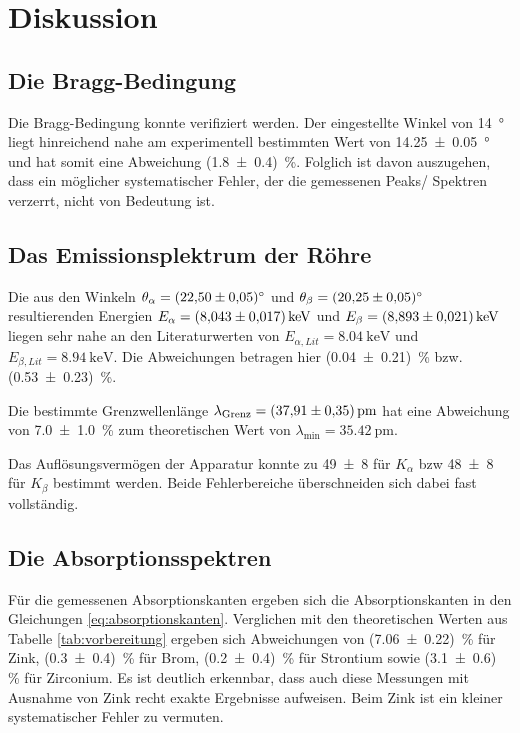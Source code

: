 \section{Diskussion}

\subsection{Die Bragg-Bedingung}
Die Bragg-Bedingung konnte verifiziert werden.
Der eingestellte Winkel von \qty[]{14}{\degree} liegt hinreichend nahe am experimentell bestimmten Wert von \qty{14.25+-0.05}{\degree}
und hat somit eine Abweichung (\num[]{1.8 +- 0.4}) \,\%.
Folglich ist davon auszugehen, dass ein möglicher systematischer Fehler, der die gemessenen Peaks/ Spektren verzerrt, nicht von Bedeutung ist.


\subsection{Das Emissionsplektrum der Röhre}
Die aus den Winkeln $\theta_\alpha = \qty{22.50 \pm 0.05}{\degree}$ und $\theta_\beta = \qty{20.25 \pm 0.05}{\degree}$
 resultierenden Energien $E_\alpha = \qty{8.043 \pm 0.017}{\kilo\eV}$ und $E_\beta  = \qty{8.893 \pm 0.021}{\kilo\eV}$
liegen sehr nahe an den Literaturwerten von $E_{\alpha,Lit} = \qty[]{8.04}{\kilo\electronvolt}$ und
$E_{\beta,Lit} = \qty[]{8.94}{\kilo\electronvolt}$.
Die Abweichungen betragen hier (\num[]{0.04 +- 0.21}) \,\% bzw. (\num[]{0.53 +- 0.23}) \,\%.

\noindent
Die bestimmte Grenzwellenlänge $\lambda_\text{Grenz}  = \qty{37.91 \pm 0.35}{\pico\meter}$ hat eine Abweichung von \num[]{7.0 +- 1.0} \,\%
zum theoretischen Wert von $\lambda_\text{min}= \qty{35.42}{\pico\m}$.

\noindent
Das Auflösungsvermögen der Apparatur konnte zu \num[]{49 +- 8} für $K_\alpha$ bzw \num[]{48 +- 8} für $K_\beta$
bestimmt werden.
Beide Fehlerbereiche überschneiden sich dabei fast vollständig.





\subsection{Die Absorptionsspektren}
Für die gemessenen Absorptionskanten ergeben sich die Absorptionskanten in den Gleichungen \eqref{eq:absorptionskanten}.
Verglichen mit den theoretischen Werten aus Tabelle \ref{tab:vorbereitung} ergeben sich Abweichungen von (\num[]{7.06 +- 0.22}) \,\% für Zink,
(\num[]{0.3 +- 0.4}) \,\% für Brom, (\num[]{0.2 +- 0.4}) \,\% für Strontium sowie (\num[]{3.1 +- 0.6}) \,\% für Zirconium.
Es ist deutlich erkennbar, dass auch diese Messungen mit Ausnahme von Zink recht exakte Ergebnisse aufweisen.
Beim Zink ist ein kleiner systematischer Fehler zu vermuten.

